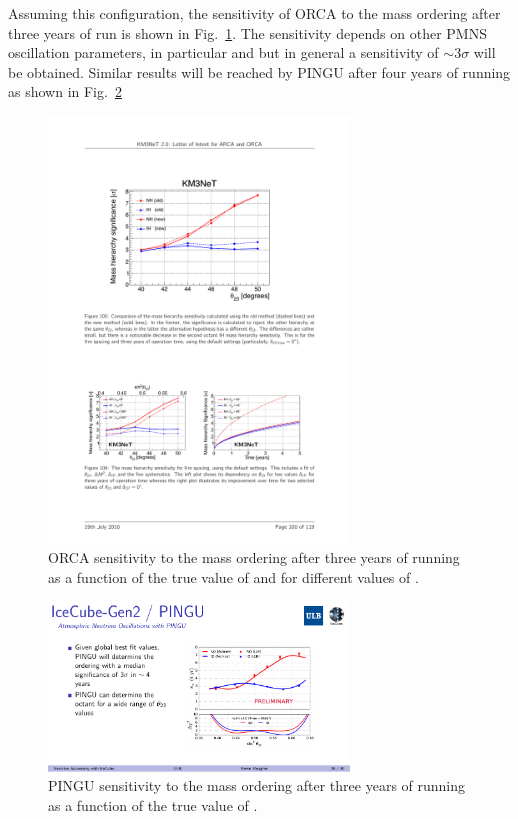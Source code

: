 Assuming this configuration, the sensitivity of ORCA to the mass ordering after three years of run is shown in Fig.~\ref{fig:orcasensi}. The sensitivity depends on other PMNS oscillation parameters, in particular \thatm and \dcp but in general a sensitivity of $\sim3\sigma$ will be obtained. Similar results will be reached by PINGU after four years of running as shown in Fig.~\ref{fig:pingusensi}

\begin{figure} [h!]
\begin{center}
\includegraphics[width=8cm]{figures/orca_sensi.pdf}
\caption{\label{fig:orcasensi} ORCA sensitivity to the mass ordering after three years of running as a function of the true value of \thatm and for different values of \dcp.}
\end{center}
\end{figure}

\begin{figure} [h!]
\begin{center}
\includegraphics[width=8cm]{figures/pingu_sensi.pdf}
\caption{\label{fig:pingusensi} PINGU sensitivity to the mass ordering after three years of running as a function of the true value of \thatm.}
\end{center}
\end{figure}


